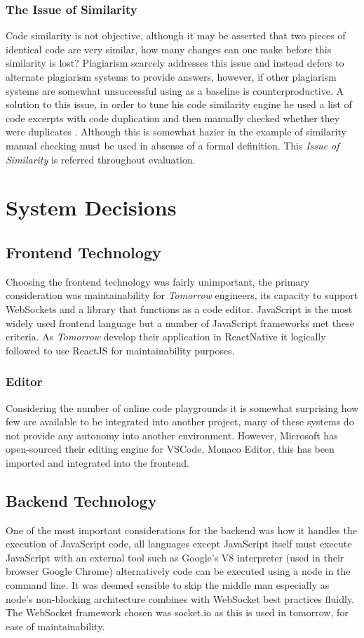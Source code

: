 \documentclass[jou,apacite]{apa6}
\begin{document}
\subsubsection{The Issue of Similarity}
Code similarity is not objective, although it may be asserted that two pieces of identical code are very similar, how many changes can one make before this similarity is lost? Plagiarism scarcely addresses this issue and instead defers to alternate plagiarism systems to provide answers, however, if other plagiarism systems are somewhat unsuccessful using as  a baseline is counterproductive. A solution to this issue, in order to tune his code similarity engine he used a list of code excerpts with code duplication and then manually checked whether they were duplicates \cite{Krinke2002}. Although this is somewhat hazier in the example of similarity manual checking must be used in absense of a formal definition. This \textit{Issue of Similarity} is referred throughout evaluation.

\clearpage

\section{System Decisions}
\subsection{Frontend Technology}
Choosing the frontend technology was fairly unimportant, the primary consideration was maintainability for \textit{Tomorrow} engineers, its capacity to support WebSockets and a library that functions as a code editor. JavaScript is the most widely used frontend language but a number of JavaScript frameworks met these criteria. As \textit{Tomorrow} develop their application in ReactNative it logically followed to use ReactJS for maintainability purposes. 
\subsubsection{Editor}
Considering the number of online code playgrounds it is somewhat surprising how few are available to be integrated into another project, many of these systems do not provide any autonomy into another environment. However, Microsoft has open-sourced their editing engine for VSCode, Monaco Editor, this has been imported and integrated into the frontend. 
\subsection{Backend Technology}
One of the most important considerations for the backend was how it handles the execution of JavaScript code, all languages except JavaScript itself must execute JavaScript with an external tool such as Google’s V8 interpreter (used in their browser Google Chrome) alternatively code can be executed using a node in the command line. It was deemed sensible to skip the middle man especially as node's non-blocking architecture combines with WebSocket best practices fluidly. The WebSocket framework chosen was socket.io as this is used in tomorrow, for ease of maintainability.
\end{document}
